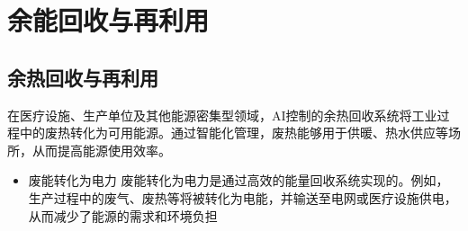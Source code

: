 \section{余能回收与再利用}\label{ux4f59ux80fdux56deux6536ux4e0eux518dux5229ux7528}

\subsection{余热回收与再利用}\label{ux4f59ux70edux56deux6536ux4e0eux518dux5229ux7528}

在医疗设施、生产单位及其他能源密集型领域，AI控制的余热回收系统将工业过程中的废热转化为可用能源。通过智能化管理，废热能够用于供暖、热水供应等场所，从而提高能源使用效率。

\begin{itemize}
\tightlist
\item
  废能转化为电力
  废能转化为电力是通过高效的能量回收系统实现的。例如，生产过程中的废气、废热等将被转化为电能，并输送至电网或医疗设施供电，从而减少了能源的需求和环境负担
\end{itemize}
